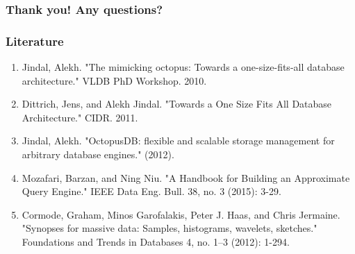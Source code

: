 \documentclass{beamer}
\begin{document}
\begin{frame}
 \frametitle{Thank you! Any questions?}
\end{frame}

\begin{frame}
\frametitle{Literature}
\begin{enumerate}
\item{Jindal, Alekh. "The mimicking octopus: Towards a one-size-fits-all database architecture." VLDB PhD Workshop. 2010.}
\item{Dittrich, Jens, and Alekh Jindal. "Towards a One Size Fits All Database Architecture." CIDR. 2011.}
\item{Jindal, Alekh. "OctopusDB: flexible and scalable storage management for arbitrary database engines." (2012).}
\item{Mozafari, Barzan, and Ning Niu. "A Handbook for Building an Approximate Query Engine." IEEE Data Eng. Bull. 38, no. 3 (2015): 3-29.}
\item{Cormode, Graham, Minos Garofalakis, Peter J. Haas, and Chris Jermaine. "Synopses for massive data: Samples, histograms, wavelets, sketches." Foundations and Trends in Databases 4, no. 1–3 (2012): 1-294.}
\end{enumerate}
\end{frame}
\end{document}
